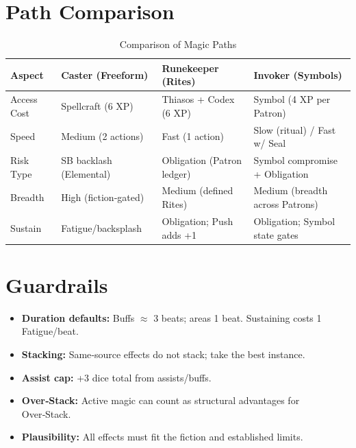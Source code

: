 \section{Path Comparison}\label{sec:path_comparison}

\begin{longtable}{p{3.5cm}p{4cm}p{4cm}p{4cm}}
\caption{Comparison of Magic Paths}\label{tab:path_comparison}\\
\toprule
\textbf{Aspect} & \textbf{Caster (Freeform)} & \textbf{Runekeeper (Rites)} & \textbf{Invoker (Symbols)} \\
\midrule
Access Cost & Spellcraft (6 XP) & Thiasos + Codex (6 XP) & Symbol (4 XP per Patron) \\
Speed & Medium (2 actions) & Fast (1 action) & Slow (ritual) / Fast w/ Seal \\
Risk Type & SB backlash (Elemental) & Obligation (Patron ledger) & Symbol compromise + Obligation \\
Breadth & High (fiction‑gated) & Medium (defined Rites) & Medium (breadth across Patrons) \\
Sustain & Fatigue/backsplash & Obligation; Push adds +1 & Obligation; Symbol state gates \\
\bottomrule
\end{longtable}

\section*{Guardrails}\label{sec:magic_guardrails}
\begin{itemize}
    \item \textbf{Duration defaults:} Buffs $\approx$ 3 beats; areas 1 beat. Sustaining costs 1 Fatigue/beat.
    \item \textbf{Stacking:} Same‑source effects do not stack; take the best instance.
    \item \textbf{Assist cap:} +3 dice total from assists/buffs.
    \item \textbf{Over‑Stack:} Active magic can count as structural advantages for Over‑Stack.
    \item \textbf{Plausibility:} All effects must fit the fiction and established limits.
\end{itemize}



